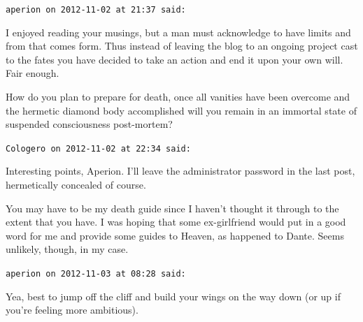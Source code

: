 \begin{footnotesize}
\begin{sffamily}
\texttt{aperion on 2012-11-02 at 21:37 said:}

I enjoyed reading your musings, but a man must acknowledge to have limits and from that comes form. Thus instead of leaving the blog to an ongoing project cast to the fates you have decided to take an action and end it upon your own will. Fair enough.

How do you plan to prepare for death, once all vanities have been overcome and the hermetic diamond body accomplished will you remain in an immortal state of suspended consciousness post-mortem?

\hfill

\texttt{Cologero on 2012-11-02 at 22:34 said:}

Interesting points, Aperion. I'll leave the administrator password in the last post, hermetically concealed of course.

You may have to be my death guide since I haven't thought it through to the extent that you have. I was hoping that some ex-girlfriend would put in a good word for me and provide some guides to Heaven, as happened to Dante. Seems unlikely, though, in my case.

\hfill

\texttt{aperion on 2012-11-03 at 08:28 said:}

Yea, best to jump off the cliff and build your wings on the way down (or up if you're feeling more ambitious).


\hfill

\end{sffamily}
\end{footnotesize}

